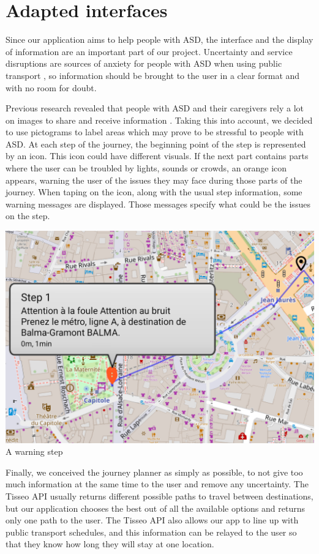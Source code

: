 \section{Adapted interfaces}

Since our application aims to help people with ASD, the interface and the display of information are an important part of our project. Uncertainty and service disruptions are sources of anxiety for people with ASD when using public transport \cite{2020ExperiencesYoungAutistic}, so information should be brought to the user in a clear format and with no room for doubt.\newline

Previous research revealed that people with ASD and their caregivers rely a lot on images to share and receive information \cite{2018MobilityPoliciesExtraSmall}. Taking this into account, we decided to use pictograms to label areas which may prove to be stressful to people with ASD. At each step of the journey, the beginning point of the step is represented by an icon. This icon could have different visuals. If the next part contains parts where the user can be troubled by lights, sounds or crowds, an orange icon appears, warning the user of the issues they may face during those parts of the journey. When taping on the icon, along with the usual step information, some warning messages are displayed. Those messages specify what could be the issues on the step.\newline 


\begin{center}
\includegraphics[scale=0.30]{content/step warning.png}
\newline
A warning step
\newline
\end{center}

Finally, we conceived the journey planner as simply as possible, to not give too much information at the same time to the user and remove any uncertainty. The Tisseo API usually returns different possible paths to travel between destinations, but our application chooses the best out of all the available options and returns only one path to the user. The Tisseo API also allows our app to line up with public transport schedules, and this information can be relayed to the user so that they know how long they will stay at one location.
